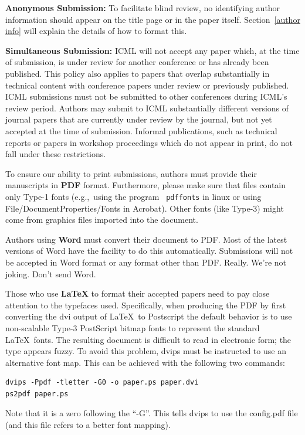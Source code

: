 \documentclass{article}
\begin{document}
{\bf Anonymous Submission:} To facilitate blind review, no identifying
author information should appear on the title page or in the paper
itself.  Section~\ref{author info} will explain the details of how to
format this.

{\bf Simultaneous Submission:} ICML will not accept any paper which,
at the time of submission, is under review for another conference or
has already been published. This policy also applies to papers that
overlap substantially in technical content with conference papers
under review or previously published. ICML submissions must not be
submitted to other conferences during ICML's review period. Authors
may submit to ICML substantially different versions of journal papers
that are currently under review by the journal, but not yet accepted
at the time of submission. Informal publications, such as technical
reports or papers in workshop proceedings which do not appear in
print, do not fall under these restrictions.

\medskip

To ensure our ability to print submissions, authors must provide their
manuscripts in \textbf{PDF} format.  Furthermore, please make sure
that files contain only Type-1 fonts (e.g.,~using the program {\tt
  pdffonts} in linux or using File/DocumentProperties/Fonts in
Acrobat).  Other fonts (like Type-3) might come from graphics files
imported into the document.

Authors using \textbf{Word} must convert their document to PDF.  Most
of the latest versions of Word have the facility to do this
automatically.  Submissions will not be accepted in Word format or any
format other than PDF. Really. We're not joking. Don't send Word.

Those who use \textbf{\LaTeX} to format their accepted papers need to pay close
attention to the typefaces used.  Specifically, when producing the PDF by first
converting the dvi output of \LaTeX\ to Postscript the default behavior is to
use non-scalable Type-3 PostScript bitmap fonts to represent the standard
\LaTeX\ fonts. The resulting document is difficult to read in electronic form;
the type appears fuzzy. To avoid this problem, dvips must be instructed to use
an alternative font map.  This can be achieved with the following two commands:

{\footnotesize
\begin{verbatim}
dvips -Ppdf -tletter -G0 -o paper.ps paper.dvi
ps2pdf paper.ps
\end{verbatim}}
Note that it is a zero following the ``-G''.  This tells dvips to use
the config.pdf file (and this file refers to a better font mapping).
\end{document}
